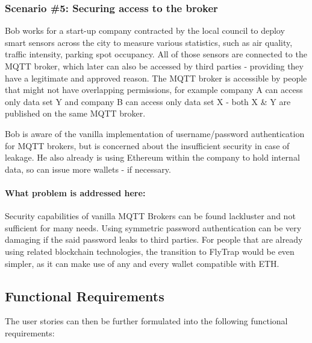 \subsubsection{Scenario \#5: Securing access to the broker}
Bob works for a start-up company contracted by the local council to deploy smart sensors across the city to measure various statistics, such as air quality, traffic intensity, parking spot occupancy. All of those sensors are connected to the MQTT broker, which later can also be accessed by third parties - providing they have a legitimate and approved reason. The MQTT broker is accessible by people that might not have overlapping permissions, for example company A can access only data set Y and company B can access only data set X - both X \& Y are published on the same MQTT broker.

Bob is aware of the vanilla implementation of username/password authentication for MQTT brokers, but is concerned about the insufficient security in case of leakage. He also already is using Ethereum within the company to hold internal data, so can issue more wallets - if necessary.
\paragraph{\textbf{What problem is addressed here:}}
Security capabilities of vanilla MQTT Brokers can be found lackluster and not sufficient for many needs. Using symmetric password authentication can be very damaging if the said password leaks to third parties. For people that are already using related blockchain technologies, the transition to FlyTrap would be even simpler, as it can make use of any and every wallet compatible with ETH.

\subsection{Functional Requirements}

The user stories can then be further formulated into the following functional requirements:

